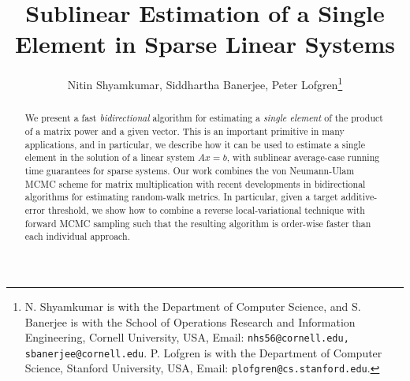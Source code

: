 \documentclass[letterpaper,conference]{ieeeconf}
\begin{document}


\title{Sublinear Estimation of a Single Element in Sparse Linear Systems}


\author{Nitin Shyamkumar, Siddhartha Banerjee, Peter Lofgren\thanks{N. Shyamkumar is with the Department of Computer Science, and S. Banerjee is with the School of Operations Research and Information Engineering, Cornell University, USA, Email: {\tt nhs56@cornell.edu, sbanerjee@cornell.edu}. P. Lofgren is with the Department of Computer Science, Stanford University, USA, Email: {\tt plofgren@cs.stanford.edu}.}}

\maketitle

\begin{abstract}
We present a fast \emph{bidirectional} algorithm for estimating a \emph{single element} of the product of a matrix power and a given vector.
This is an important primitive in many applications, and in particular, we describe how it can be used to estimate a single element in the solution of a linear system $Ax=b$, with sublinear average-case running time guarantees for sparse systems.
Our work combines the von Neumann-Ulam MCMC scheme for matrix multiplication with recent developments in bidirectional
algorithms for estimating random-walk metrics. 
In particular, given a target additive-error threshold, we show how to combine a reverse local-variational technique with forward MCMC sampling such that the resulting algorithm is order-wise faster than each individual approach.      
\end{abstract}








 
\end{document}
